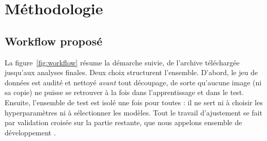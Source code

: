 \section{Méthodologie}
\label{sec:methodologie}

\subsection{Workflow proposé}
\label{sec:workflow}

La figure~\ref{fig:workflow} résume la démarche suivie, de l'archive téléchargée jusqu'aux analyses finales. Deux choix structurent l'ensemble. D'abord, le jeu de données est audité et nettoyé \emph{avant} tout découpage, de sorte qu'aucune image (ni sa copie) ne puisse se retrouver à la fois dans l'apprentissage et dans le test. Ensuite, l'ensemble de test est isolé une fois pour toutes : il ne sert ni à choisir les hyperparamètres ni à sélectionner les modèles. Tout le travail d'ajustement se fait par validation croisée sur la partie restante, que nous appelons \og ensemble de développement \fg{}.

